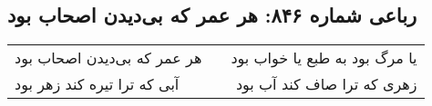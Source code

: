 \begin{center}
\section*{رباعی شماره ۸۴۶: هر عمر که بی‌دیدن اصحاب بود}
\label{sec:0846}
\begin{longtable}{l p{0.5cm} r}
هر عمر که بی‌دیدن اصحاب بود
&&
یا مرگ بود به طبع یا خواب بود
\\
آبی که ترا تیره کند زهر بود
&&
زهری که ترا صاف کند آب بود
\\
\end{longtable}
\end{center}
